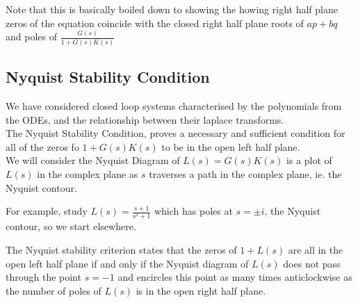 Note that this is basically boiled down to showing the howing right half plane zeros of the equation coincide with the closed right half plane roots of $ap + bq$ and poles of $\frac{G(s)}{1 + G(s)K(s)}$

\subsection{Nyquist Stability Condition}
We have considered closed loop systems characterised by the polynomials from the ODEs, and the relationship between their laplace transforms. \\

The Nyquist Stability Condition, proves a necessary and sufficient condition for all of the zeros fo $1 + G(s)K(s)$ to be in the open left half plane. \\

We will consider the Nyquist Diagram of $L(s) = G(s)K(s)$ is a plot of $L(s)$ in the complex plane as $s$ traverses a path in the complex plane, ie. the Nyquist contour.

\begin{eg}
  For example, study $L(s) = \frac{s+1}{s^2 + 1}$ which has poles at $s = \pm i$, the Nyquist contour, so we start elsewhere.
\end{eg}

\begin{nlemma}
  The Nyquist stability criterion states that the zeros of $1 + L(s)$ are all in the open left half plane if and only if the Nyquist diagram of $L(s)$ does not pass through the point $s = -1$ and encircles this point as many times anticlockwise as the number of poles of $L(s)$ is in the open right half plane.
\end{nlemma}
